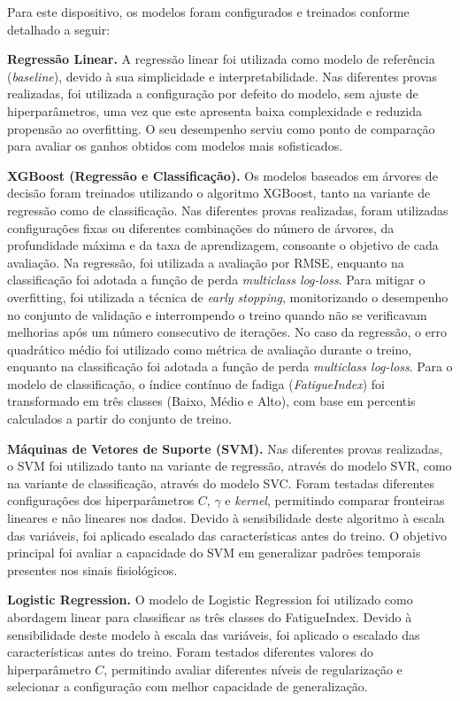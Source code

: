 Para este dispositivo, os modelos foram configurados e treinados conforme detalhado a seguir:

\textbf{Regressão Linear.}  
A regressão linear foi utilizada como modelo de referência (\textit{baseline}), devido à sua simplicidade e interpretabilidade. Nas diferentes provas realizadas, foi utilizada a configuração por defeito do modelo, sem ajuste de hiperparâmetros, uma vez que este apresenta baixa complexidade e reduzida propensão ao overfitting. O seu desempenho serviu como ponto de comparação para avaliar os ganhos obtidos com modelos mais sofisticados.

\textbf{XGBoost (Regressão e Classificação).}  
Os modelos baseados em árvores de decisão foram treinados utilizando o algoritmo XGBoost, tanto na variante de regressão como de classificação. Nas diferentes provas realizadas, foram utilizadas configurações fixas ou diferentes combinações do número de árvores, da profundidade máxima e da taxa de aprendizagem, consoante o objetivo de cada avaliação. Na regressão, foi utilizada a avaliação por RMSE, enquanto na classificação foi adotada a função de perda \textit{multiclass log-loss}. Para mitigar o overfitting, foi utilizada a técnica de \textit{early stopping}, monitorizando o desempenho no conjunto de validação e interrompendo o treino quando não se verificavam melhorias após um número consecutivo de iterações.  
No caso da regressão, o erro quadrático médio foi utilizado como métrica de avaliação durante o treino, enquanto na classificação foi adotada a função de perda \textit{multiclass log-loss}. Para o modelo de classificação, o índice contínuo de fadiga (\textit{FatigueIndex}) foi transformado em três classes (Baixo, Médio e Alto), com base em percentis calculados a partir do conjunto de treino.

\textbf{Máquinas de Vetores de Suporte (SVM).}  
Nas diferentes provas realizadas, o SVM foi utilizado tanto na variante de regressão, através do modelo SVR, como na variante de classificação, através do modelo SVC. Foram testadas diferentes configurações dos hiperparâmetros $C$, $\gamma$ e \textit{kernel}, permitindo comparar fronteiras lineares e não lineares nos dados. Devido à sensibilidade deste algoritmo à escala das variáveis, foi aplicado escalado das características antes do treino. O objetivo principal foi avaliar a capacidade do SVM em generalizar padrões temporais presentes nos sinais fisiológicos.

\textbf{Logistic Regression.}  
O modelo de Logistic Regression foi utilizado como abordagem linear para classificar as três classes do FatigueIndex. Devido à sensibilidade deste modelo à escala das variáveis, foi aplicado o escalado das características antes do treino. Foram testados diferentes valores do hiperparâmetro $C$, permitindo avaliar diferentes níveis de regularização e selecionar a configuração com melhor capacidade de generalização.

